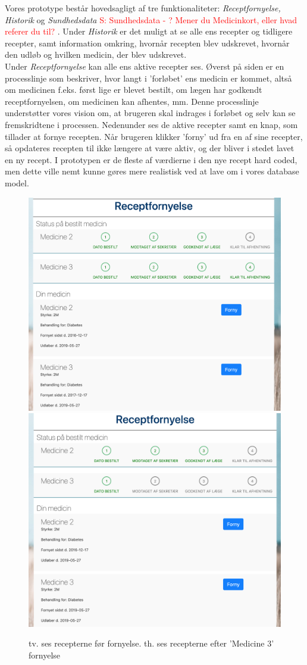 Vores prototype består hovedsagligt af tre funktionaliteter: \textit{Receptfornyelse, Historik} og \textit{Sundhedsdata}
\textcolor{red}{S: Sundhedsdata - ? Mener du Medicinkort, eller hvad referer du til?}
. Under \textit{Historik} er det muligt at se alle ens recepter og tidligere recepter, samt information omkring, hvornår recepten blev udskrevet, hvornår den udløb og hvilken medicin, der blev udskrevet.\\
Under \textit{Receptfornyelse} kan alle ens aktive recepter ses. Øverst på siden er en processlinje som beskriver, hvor langt i 'forløbet' ens medicin er kommet, altså om medicinen f.eks. først lige er blevet bestilt, om lægen har godkendt receptfornyelsen, om medicinen kan afhentes, mm. Denne processlinje understøtter vores vision om, at brugeren skal indrages i forløbet og selv kan se fremskridtene i processen. Nedenunder ses de aktive recepter samt en knap, som tillader at fornye recepten. Når brugeren klikker 'forny' ud fra en af sine recepter, så opdateres recepten til ikke længere at være aktiv, og der bliver i stedet lavet en ny recept. I prototypen er de fleste af værdierne i den nye recept hard coded, men dette ville nemt kunne gøres mere realistisk ved at lave om i vores database model.
\begin{figure}[h!]
	\includegraphics[width=0.49\linewidth]{Materials/Prototype/Receptfornyelse}
	\includegraphics[width=0.49\linewidth]{Materials/Prototype/ReceptfornyelseFornyet}
	\caption{tv. ses recepterne før fornyelse. th. ses recepterne efter 'Medicine 3' fornyelse}
\end{figure}

